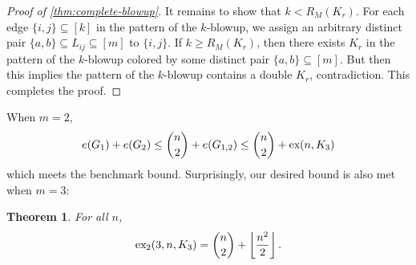 \documentclass[12pt]{report}
\newtheorem{theorem}{Theorem}[chapter]
\newcommand*{\ex}{\textnormal{ex}}
\newcommand*{\dex}{\textnormal{ex}_2}
\begin{document}
\begin{proof}[Proof of \cref{thm:complete-blowup}]
  It remains to show that $k < R_M(K_r)$. For each edge $\{i, j\} \subseteq [k]$ in the pattern of the $k$-blowup, we assign an arbitrary distinct pair $\{a, b\} \subseteq L_{ij} \subseteq [m]$ to $\{i, j\}$. If $k \geq R_M(K_r)$, then there exists $K_r$ in the pattern of the $k$-blowup colored by some distinct pair $\{a, b\} \subseteq [m]$. But then this implies the pattern of the $k$-blowup contains a double $K_r$, contradiction. This completes the proof.
\end{proof}





When $m = 2$, 
\[
	e(G_1) + e(G_2) \leq \binom{n}{2} + e(G_{1, 2}) \leq \binom{n}{2} + \ex(n, K_3)
\]
which meets the benchmark bound. Surprisingly, our desired bound is also met when $m = 3$:

\begin{theorem}
  For all $n$,
  \[
    \dex(3, n, K_3) = \binom{n}{2} + \left\lfloor \frac{n^2}{2} \right\rfloor.
  \]
\end{theorem}
\end{document}
